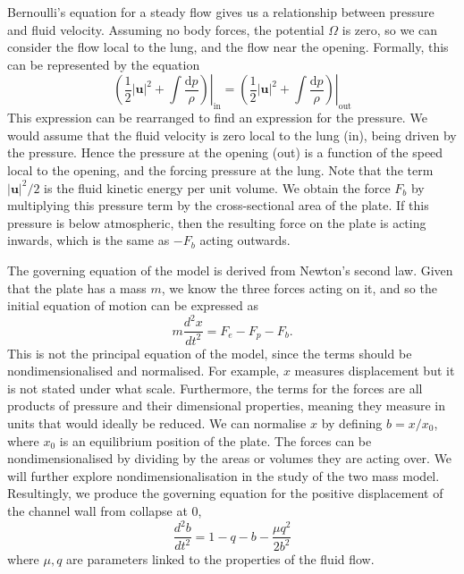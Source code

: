 Bernoulli's equation for a steady flow gives us a relationship between pressure and fluid velocity.
Assuming no body forces, the potential $\Omega$ is zero,
so we can consider the flow local to the lung, and the flow near the opening.
Formally, this can be represented by the equation
\begin{equation}
    \left.\left(\frac{1}{2}|\mathbf{u}|^2 + \int \frac{\mathrm{d}p}{\rho}\right)\right|_\mathrm{in} = \left.\left(\frac{1}{2}|\mathbf{u}|^2 + \int \frac{\mathrm{d}p}{\rho}\right)\right|_\mathrm{out}
\end{equation}
This expression can be rearranged to find an expression for the pressure.
We would assume that the fluid velocity is zero local to the lung (in),
being driven by the pressure.
Hence the pressure at the opening (out) is a function of the speed local to the opening,
and the forcing pressure at the lung.
Note that the term $|\mathbf{u}|^2/2$ is the fluid kinetic energy per unit volume.
We obtain the force $F_b$ by multiplying this pressure term by the cross-sectional area of the plate.
If this pressure is below atmospheric,
then the resulting force on the plate is acting inwards,
which is the same as $-F_b$ acting outwards.

The governing equation of the model is derived from Newton's second law.
Given that the plate has a mass $m$, we know the three forces acting on it,
and so the initial equation of motion can be expressed as
\begin{equation}
    m\frac{d^2 x}{dt^2} = F_e - F_p - F_b.
    \label{eqn:model_init}
\end{equation}
This is not the principal equation of the model,
since the terms should be nondimensionalised and normalised.
For example, $x$ measures displacement but it is not stated under what scale.
Furthermore, the terms for the forces are all products of pressure and their dimensional properties,
meaning they measure in units that would ideally be reduced.
We can normalise $x$ by defining $b = x/x_0$, where $x_0$ is an equilibrium position of the plate.
The forces can be nondimensionalised by dividing by the areas or volumes they are acting over.
We will further explore nondimensionalisation in the study of the two mass model.
Resultingly, we produce the governing equation for the positive displacement of the channel wall from collapse at $0$,
\begin{equation}
    \frac{d^2b}{dt^2} = 1 - q - b - \frac{\mu q^2}{2b^2}
    \label{eqn:master}
\end{equation}
where $\mu, q$ are parameters linked to the properties of the fluid flow.

